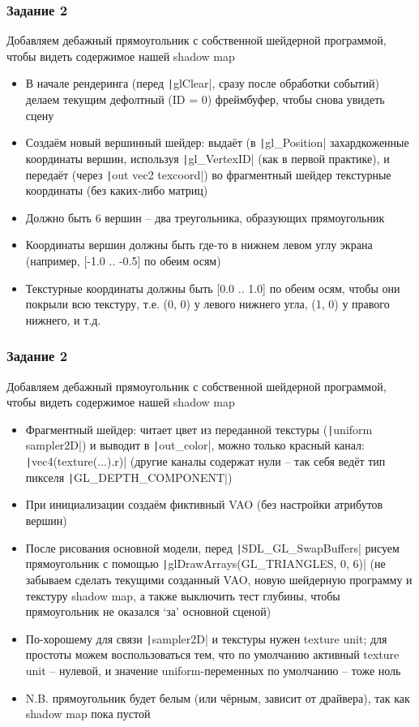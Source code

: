 \documentclass[10pt]{beamer}
\begin{document}
\begin{frame}[fragile]
\frametitle{Задание 2}
\begin{footnotesize}
Добавляем дебажный прямоугольник с собственной шейдерной программой, чтобы видеть содержимое нашей shadow map
\begin{itemize}
\item В начале рендеринга (перед \texttt|glClear|, сразу после обработки событий) делаем текущим дефолтный (ID = 0) фреймбуфер, чтобы снова увидеть сцену
\item Создаём новый вершинный шейдер: выдаёт (в \texttt|gl_Position| захардкоженные координаты вершин, используя \texttt|gl_VertexID| (как в первой практике), и передаёт (через \texttt|out vec2 texcoord|) во фрагментный шейдер текстурные координаты (без каких-либо матриц)
\item Должно быть 6 вершин -- два треугольника, образующих прямоугольник
\item Координаты вершин должны быть где-то в нижнем левом углу экрана (например, [-1.0 .. -0.5] по обеим осям)
\item Текстурные координаты должны быть [0.0 .. 1.0] по обеим осям, чтобы они покрыли всю текстуру, т.е. (0, 0) у левого нижнего угла, (1, 0) у правого нижнего, и т.д.
\end{itemize}
\end{footnotesize}
\end{frame}

\begin{frame}[fragile]
\frametitle{Задание 2}
\begin{footnotesize}
Добавляем дебажный прямоугольник с собственной шейдерной программой, чтобы видеть содержимое нашей shadow map
\begin{itemize}
\item Фрагментный шейдер: читает цвет из переданной текстуры (\texttt|uniform sampler2D|) и выводит в \texttt|out_color|, можно только красный канал: \texttt|vec4(texture(...).r)| (другие каналы содержат нули -- так себя ведёт тип пикселя \texttt|GL_DEPTH_COMPONENT|)
\item При инициализации создаём фиктивный VAO (без настройки атрибутов вершин)
\item После рисования основной модели, перед \texttt|SDL_GL_SwapBuffers| рисуем прямоугольник с помощью \texttt|glDrawArrays(GL_TRIANGLES, 0, 6)| (не забываем сделать текущими созданный VAO, новую шейдерную программу и текстуру shadow map, а также выключить тест глубины, чтобы прямоугольник не оказался `за' основной сценой)
\item По-хорошему для связи \texttt|sampler2D| и текстуры нужен texture unit; для простоты можем воспользоваться тем, что по умолчанию активный texture unit -- нулевой, и значение uniform-переменных по умолчанию -- тоже ноль
\item N.B. прямоугольник будет белым (или чёрным, зависит от драйвера), так как shadow map пока пустой
\end{itemize}
\end{footnotesize}
\end{frame}
\end{document}
